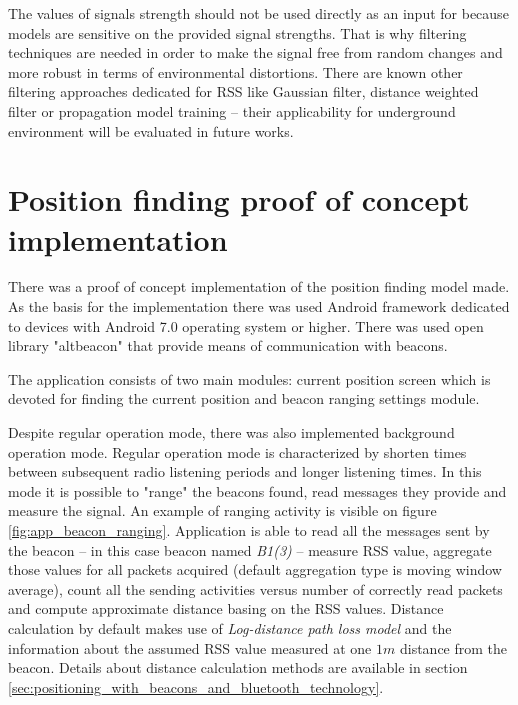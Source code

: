 \documentclass[../main.tex]{subfiles}
\begin{document}
The values of signals strength should not be used directly as an input for because models are sensitive on the provided signal strengths. That is why filtering techniques are needed in order to make the signal free from random changes and more robust in terms of environmental distortions. There are known other filtering approaches dedicated for RSS like Gaussian filter, distance weighted filter or propagation model training \cite{article_rssi_learning_and_filtering_for_navi} -- their applicability for underground environment will be evaluated in future works.


\section{Position finding proof of concept implementation} %
\label{sec:simple_position_finding_algorithm_implementation}

There was a proof of concept implementation of the position finding model made. As the basis for the implementation there was used Android framework dedicated to devices with Android 7.0 operating system or higher. There was used open library "altbeacon" that provide means of communication with beacons.

The application consists of two main modules: current position screen which is devoted for finding the current position and beacon ranging settings module.

Despite regular operation mode, there was also implemented background operation mode. Regular operation mode is characterized by shorten times between subsequent radio listening periods and longer listening times. In this mode it is possible to "range" the beacons found, read messages they provide and measure the signal. An example of ranging activity is visible on figure \ref{fig:app_beacon_ranging}. Application is able to read all the messages sent by the beacon -- in this case beacon named \textit{B1(3)} -- measure RSS value, aggregate those values for all packets acquired (default aggregation type is moving window average), count all the sending activities versus number of correctly read packets and compute approximate distance basing on the RSS values. Distance calculation by default makes use of \textit{Log-distance path loss model} and the information about the assumed RSS value measured at one $1m$ distance from the beacon. Details about distance calculation methods are available in section \ref{sec:positioning_with_beacons_and_bluetooth_technology}.
\end{document}
